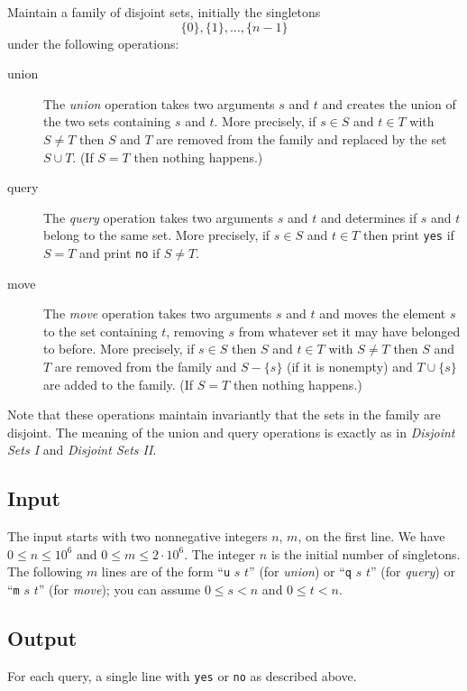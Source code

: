 \documentclass{tufte-handout}
\begin{document}
Maintain a family of disjoint sets, initially the singletons
\[ \{0\},\{1\}, \ldots,\{n-1\} \]
under the following operations:
\begin{description}
  \item[union]
The \emph{union} operation takes two arguments $s$ and $t$ and creates the union of the two sets containing $s$ and $t$.
More precisely, if $s\in S$ and $t\in T$ with $S\neq T$ then $S$ and $T$ are removed from the family and replaced by the set $S\cup T$. 
    (If $S=T$  then nothing happens.)
  \item[query]
    The \emph{query} operation takes two arguments $s$ and $t$ and determines if $s$ and $t$ belong to the same set.
    More precisely, if $s\in S$ and $t\in T$ then print \texttt{yes} if $S=T$ and print \texttt{no} if $S\neq T$.
  \item[move]
    The \emph{move} operation takes two arguments $s$ and $t$ and moves the element $s$ to the set containing $t$, removing $s$ from whatever set it may have belonged to before.
    More precisely, if $s\in S$ then $S$ and $t\in T$ with $S\neq T$ then $S$ and $T$ are removed from the family and $S-\{s\}$ (if it is nonempty)  and $T\cup\{s\}$ are added to the family.
    (If $S= T$ then nothing happens.)
\end{description}
Note that these operations maintain invariantly that the sets in the family are disjoint.
The meaning of the union and query operations is exactly as in \emph{Disjoint Sets I} and \emph{Disjoint Sets II}.

\subsection{Input}

The input starts with two nonnegative integers $n$, $m$, on the first line.
We have $0\leq n\leq 10^6$ and $0\leq m\leq 2\cdot 10^6$.
The integer $n$ is the initial number of singletons.
The following $m$ lines are of the form ``\texttt{u} $s$ $t$'' (for \emph{union}) or ``\texttt{q} $s$ $t$'' (for \emph{query}) or ``\texttt{m} $s$ $t$'' (for \emph{move}); you can assume $0\leq s< n$ and $0\leq t< n$.

\subsection{Output}

For each query, a single line with \texttt{yes} or \texttt{no} as described above.
\end{document}
